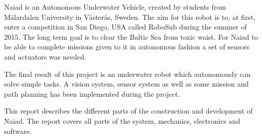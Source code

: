 \documentclass[10pt, titlepage]{article}
\begin{document}
\begin{titlepage}

\end{titlepage}

\thispagestyle{fancy}
\fancyfoot[L]{}
\renewcommand{\headrulewidth}{0.4pt}
\renewcommand{\footrulewidth}{0.4pt}


\def\abstract{
   \vfil
\begin{center}%
{\bfseries\abstractname\vspace{-.5em}}
\end{center}
\itshape
}

\def\endabstract{\par
}
\begin{abstract}
Naiad is an Autonomous Underwater Vehicle, created by students from Mälardalen University in Västerås, Sweden. The aim for this robot is to, at first, enter a competition in San Diego, USA called RoboSub during the summer of 2015. The long term goal is to clear the Baltic Sea from toxic waist. For Naiad to be able to complete missions given to it in autonomous fashion a set of sensors and actuators was needed. 

The final result of this project is an underwater robot which autonomously can solve simple tasks. A vision system, sensor system as well as some mission and path planning has been implemented during the project.  
 
This report describes the different parts of the construction and development of Naiad. The report covers all parts of the system, mechanics, electronics and software. 
\end{abstract}
\newpage
\hypersetup{linkcolor=black}
\tableofcontents
\hypersetup{linkcolor=red}
\end{document}
